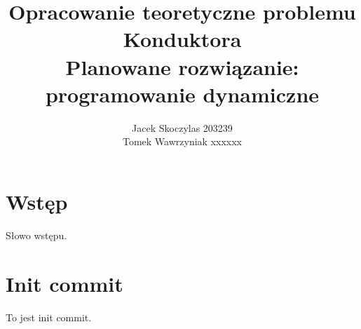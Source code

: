 \documentclass[hidelinks,12pt]{article}
\author{Jacek Skoczylas 203239 \\ Tomek Wawrzyniak xxxxxx}
\title{Opracowanie teoretyczne problemu Konduktora \\
Planowane rozwiązanie: programowanie dynamiczne}
\numberwithin{figure}{section} %
\numberwithin{equation}{section} %
\numberwithin{table}{section} %
\begin{document}
\maketitle
\newpage
\tableofcontents
\newpage

\section{Wstęp}
Słowo wstępu.

\section{Init commit}
To jest init commit.
\end{document}
